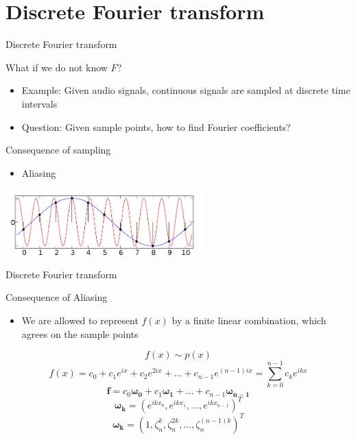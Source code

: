 \section{Discrete Fourier transform}\label{discrete-fourier-transform}

\begin{frame}{Discrete Fourier transform}

\begin{block}{What if we do not know $F$?}

\begin{itemize}
\item
  Example: Given audio signals, continuous signals are sampled at
  discrete time intervals
\item
  Question: Given sample points, how to find Fourier coefficients?
\end{itemize}

\end{block}

\begin{block}{Consequence of sampling}

\begin{itemize}
\itemsep1pt\parskip0pt
\item
  Aliasing
\end{itemize}

\centerline{\includegraphics[width=3in]{aaa.png}}

\end{block}

\end{frame}

\begin{frame}{Discrete Fourier transform}

\begin{block}{Consequence of Aliasing}

\begin{itemize}
\itemsep1pt\parskip0pt
\item
  We are allowed to represent $f(x)$ by a finite linear combination,
  which agrees on the sample points
\end{itemize}

\[f(x)\sim p(x)\]
\[f(x) = c_{0}+c_{1}e^{ix}+c_{2}e^{2ix}+\ldots+c_{n-1}e^{(n-1)ix}=\sum_{k=0}^{n-1}c_{k}e^{ikx}\]
\[\mathbf{f} = c_{0}\mathbf{\omega_{0}}+c_{1}\mathbf{\omega_{1}}+ \ldots + c_{n-1}\mathbf{\omega_{n-1}}\]
\[\mathbf{\omega_{k}}=(e^{ikx_{0}},e^{ikx_{1}},\ldots,e^{ikx_{n-1}})^{T}\]
\[\mathbf{\omega_{k}} = (1,\zeta_{n}^{k},\zeta_{n}^{2k},\ldots,\zeta_{n}^{(n-1)k})^{T}\]

\end{block}

\end{frame}

